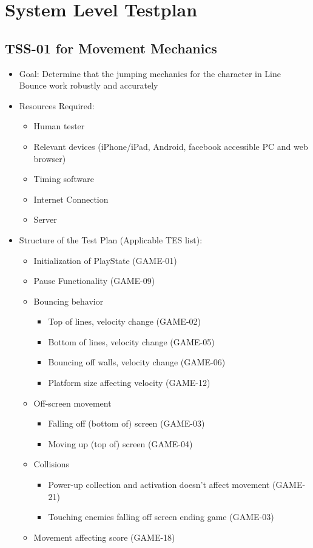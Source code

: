 \chapter{System Level Testplan}

\section{TSS-01 for Movement Mechanics}
\begin{itemize}
\item Goal: Determine that the jumping mechanics for the character in Line Bounce work robustly and accurately

\item Resources Required:
\begin{itemize}
\item Human tester
\item Relevant devices (iPhone/iPad, Android, facebook accessible PC and web browser)
\item Timing software
\item Internet Connection 
\item Server
\end{itemize}

\item Structure of the Test Plan (Applicable TES list):
\begin{itemize}
\item Initialization of PlayState (GAME-01)
\item Pause Functionality (GAME-09)
\item Bouncing behavior
\begin{itemize}
\item Top of lines, velocity change (GAME-02)
\item Bottom of lines, velocity change (GAME-05)
\item Bouncing off walls, velocity change (GAME-06)
\item Platform size affecting velocity (GAME-12)
\end{itemize}
\item Off-screen movement
\begin{itemize}
\item Falling off (bottom of) screen (GAME-03)
\item Moving up (top of) screen (GAME-04)
\end{itemize}
\item Collisions
\begin{itemize}
\item Power-up collection and activation doesn’t affect movement (GAME-21)
\item Touching enemies falling off screen ending game (GAME-03)
\end{itemize}
\item Movement affecting score (GAME-18)
\end{itemize}
\end{itemize}

